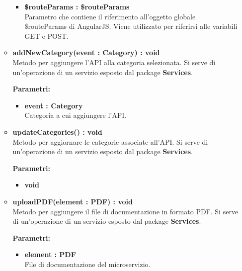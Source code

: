 \begin{itemize}
\begin{itemize}
\begin{itemize}
			\item \textbf{\$routeParams : \$routeParams}\\
			Parametro che contiene il riferimento all'oggetto globale \$routeParams di AngularJS. Viene utilizzato per riferirsi alle variabili GET e POST.
		\end{itemize}
		
		\item \textbf{addNewCategory(event : Category) : void}\\
		Metodo per aggiungere l'API alla categoria selezionata. Si serve di un'operazione di un servizio esposto dal package \textbf{Services}.
		\begin{description}
			\item[\textbf{Parametri:}]
		\end{description}
		\begin{itemize}
			\item \textbf{event : Category}\\
			Categoria a cui aggiungere l'API.
		\end{itemize}
		
		\item \textbf{updateCategories() : void}\\
		Metodo per aggiornare le categorie associate all'API. Si serve di un'operazione di un servizio esposto dal package \textbf{Services}.
		\begin{description}
			\item[\textbf{Parametri:}]
		\end{description}
		\begin{itemize}
			\item \textbf{void}\\
		\end{itemize}
		
		\item \textbf{uploadPDF(element : PDF) : void}\\
		Metodo per aggiungere il file di documentazione in formato PDF. Si serve di un'operazione di un servizio esposto dal package \textbf{Services}.
		\begin{description}
			\item[\textbf{Parametri:}]
		\end{description}
		\begin{itemize}
			\item \textbf{element : PDF}\\
			File di documentazione del microservizio.
		\end{itemize}
		

\end{itemize}
\end{itemize}

